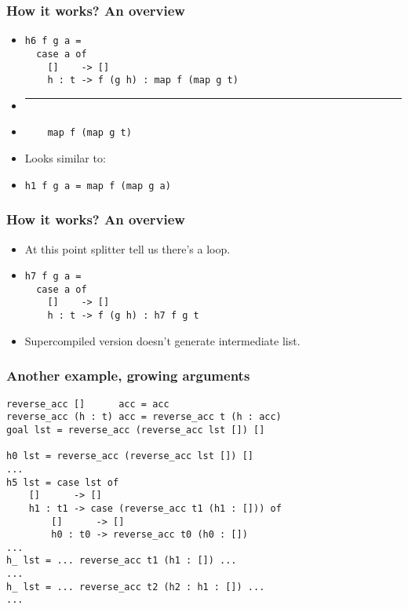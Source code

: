 \documentclass{beamer}
\begin{document}
\begin{frame}[fragile]
    \frametitle{How it works? An overview}
    \begin{itemize}
        \itemsep1em
        \item[]
            \begin{verbatim}
h6 f g a =
  case a of
    []    -> []
    h : t -> f (g h) : map f (map g t)

            \end{verbatim}

        \item[]
            \begin{center}
                \rule{4cm}{0.4pt}
            \end{center}

        \item[]
            \begin{verbatim}
    map f (map g t)
            \end{verbatim}

        \item[]
            Looks similar to:

        \item[]
            \begin{verbatim}
h1 f g a = map f (map g a)
            \end{verbatim}
    \end{itemize}
\end{frame}

\begin{frame}[fragile]
    \frametitle{How it works? An overview}
    \begin{itemize}
        \itemsep1em
        \item[]
            At this point splitter tell us there's a loop.

        \item[]
            \begin{verbatim}
h7 f g a =
  case a of
    []    -> []
    h : t -> f (g h) : h7 f g t
            \end{verbatim}

        \item[]
            Supercompiled version doesn't generate intermediate list.
    \end{itemize}
\end{frame}

\begin{frame}[fragile]
    \frametitle{Another example, growing arguments}
    \begin{verbatim}
reverse_acc []      acc = acc
reverse_acc (h : t) acc = reverse_acc t (h : acc)
goal lst = reverse_acc (reverse_acc lst []) []

h0 lst = reverse_acc (reverse_acc lst []) []
...
h5 lst = case lst of
    []      -> []
    h1 : t1 -> case (reverse_acc t1 (h1 : [])) of
        []      -> []
        h0 : t0 -> reverse_acc t0 (h0 : [])
...
h_ lst = ... reverse_acc t1 (h1 : []) ...
...
h_ lst = ... reverse_acc t2 (h2 : h1 : []) ...
...
    \end{verbatim}
\end{frame}
\end{document}
